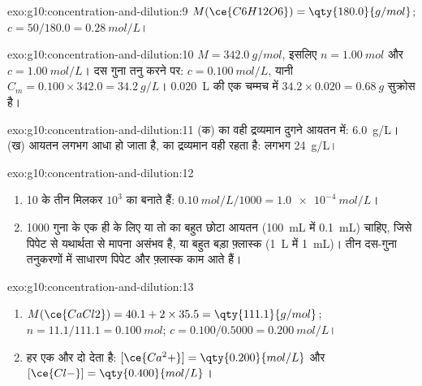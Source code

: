 \begin{solution}{exo:g10:concentration-and-dilution:9}
$M(\ce{C6H12O6}) = \qty{180.0}{g/mol}$; $c = 50 / 180.0 =
\qty{0.28}{mol/L}$।
\end{solution}

\begin{solution}{exo:g10:concentration-and-dilution:10}
$M = \qty{342.0}{g/mol}$, इसलिए $n = \qty{1.00}{mol}$ और $c =
\qty{1.00}{mol/L}$। दस गुना तनु करने पर: $c = \qty{0.100}{mol/L}$, यानी
$C_m = 0.100 \times 342.0 = \qty{34.2}{g/L}$।
\qty{0.020}{L} की एक चम्मच में $34.2 \times 0.020 = \qty{0.68}{g}$ सुक्रोस है।
\end{solution}

\begin{solution}{exo:g10:concentration-and-dilution:11}
(क)  का वही द्रव्यमान दुगने आयतन में: \qty{6.0}{g/L}।
(ख) आयतन लगभग आधा हो जाता है,  का द्रव्यमान वही रहता है: लगभग
\qty{24}{g/L}।
\end{solution}

\begin{solution}{exo:g10:concentration-and-dilution:12}
\begin{enumerate}
  \item 10 के तीन  मिलकर $10^3$ का  बनाते हैं:
        $\qty{0.10}{mol/L} / 1000 = \qty{1.0e-4}{mol/L}$।
  \item 1000 गुना के एक ही  के लिए या तो  का बहुत छोटा आयतन
        (\qty{100}{mL} में \qty{0.1}{mL}) चाहिए, जिसे पिपेट से यथार्थता से
        मापना असंभव है, या बहुत बड़ा फ़्लास्क (\qty{1}{L} में \qty{1}{mL})।
        तीन दस-गुना तनुकरणों में साधारण पिपेट और
        फ़्लास्क काम आते हैं।
\end{enumerate}
\end{solution}

\begin{solution}{exo:g10:concentration-and-dilution:13}
\begin{enumerate}
  \item $M(\ce{CaCl2}) = 40.1 + 2 \times 35.5 = \qty{111.1}{g/mol}$;
        $n = 11.1 / 111.1 = \qty{0.100}{mol}$; $c = 0.100 / 0.5000 =
        \qty{0.200}{mol/L}$।
  \item हर  एक  और दो  देता है:
        $[\ce{Ca^2+}] = \qty{0.200}{mol/L}$ और $[\ce{Cl-}] =
        \qty{0.400}{mol/L}$।
\end{enumerate}
\end{solution}


